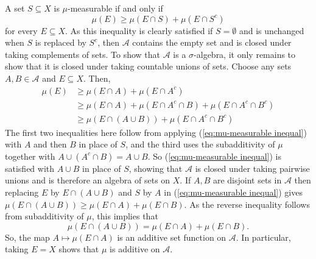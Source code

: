 \documentclass[12pt]{article}
\begin{document}
A set $S\subseteq X$ is $\mu$-measurable if and only if
\begin{equation}\label{eq:mu-measurable inequal}
\mu(E)\ge\mu(E\cap S)+\mu(E\cap S^c)
\end{equation}
for every $E\subseteq X$.
As this inequality is clearly satisfied if $S=\emptyset$ and is unchanged when $S$ is replaced by $S^c$, then $\mathcal{A}$ contains the empty set and is closed under taking complements of sets.
To show that $\mathcal{A}$ is a $\sigma$-algebra, it only remains to show that it is closed under taking countable unions of sets. Choose any sets $A,B\in\mathcal{A}$ and $E\subseteq X$. Then,
\begin{equation*}\begin{split}
\mu(E)&\ge\mu(E\cap A) + \mu(E\cap A^c)\\
&\ge\mu(E\cap A) + \mu(E\cap A^c\cap B) + \mu(E\cap A^c\cap B^c)\\
&\ge\mu(E\cap(A\cup B))+\mu(E\cap A^c\cap B^c)
\end{split}\end{equation*}
The first two inequalities here follow from applying (\ref{eq:mu-measurable inequal}) with $A$ and then $B$ in place of $S$, and the third uses the subadditivity of $\mu$ together with $A\cup (A^c\cap B) = A\cup B$. So (\ref{eq:mu-measurable inequal}) is satisfied with $A\cup B$ in place of $S$, showing that $\mathcal{A}$ is closed under taking pairwise unions and is therefore an algebra of sets on $X$. If $A,B$ are disjoint sets in $\mathcal{A}$ then replacing $E$ by $E\cap(A\cup B)$ and $S$ by $A$ in (\ref{eq:mu-measurable inequal}) gives $\mu(E\cap(A\cup B))\ge\mu(E\cap A)+\mu(E\cap B)$. As the reverse inequality follows from subadditivity of $\mu$, this implies that
\begin{equation*}
\mu(E\cap(A\cup B))=\mu(E\cap A)+\mu(E\cap B).
\end{equation*}
So, the map $A\mapsto\mu(E\cap A)$ is an additive set function on $\mathcal{A}$. In particular, taking $E=X$ shows that $\mu$ is additive on $\mathcal{A}$.
\end{document}
